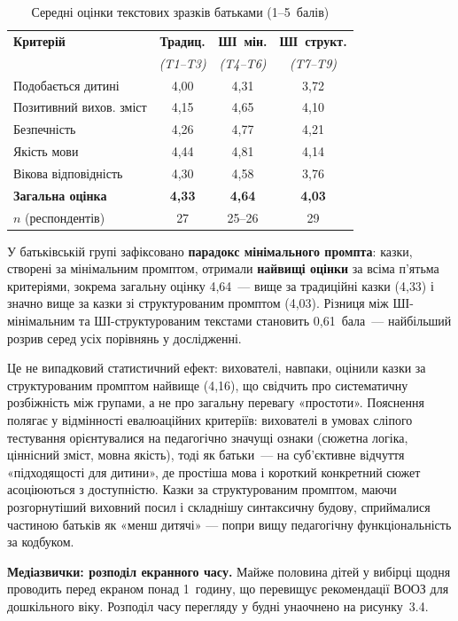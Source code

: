 \documentclass[14pt, a4paper]{extreport}
\begin{document}
\begin{table}[htbp]
\caption{Середні оцінки текстових зразків батьками (1--5~балів)}
\centering
\begin{tabular}{|l|c|c|c|}
\hline
\rowcolor{tblhead}\textbf{Критерій} & \textbf{Традиц.} & \textbf{ШІ~мін.} & \textbf{ШІ~структ.} \\
\rowcolor{tblhead} & \textit{(T1--T3)} & \textit{(T4--T6)} & \textit{(T7--T9)} \\
\hline
Подобається дитині     & 4{,}00 & 4{,}31 & 3{,}72 \\
Позитивний вихов. зміст & 4{,}15 & 4{,}65 & 4{,}10 \\
Безпечність            & 4{,}26 & 4{,}77 & 4{,}21 \\
Якість мови            & 4{,}44 & 4{,}81 & 4{,}14 \\
Вікова відповідність   & 4{,}30 & 4{,}58 & 3{,}76 \\
\textbf{Загальна оцінка} & \textbf{4{,}33} & \textbf{4{,}64} & \textbf{4{,}03} \\
\hline
$n$ (респондентів) & 27 & 25--26 & 29 \\
\hline
\end{tabular}
\end{table}

У батьківській групі зафіксовано \textbf{парадокс мінімального промпта}: казки, створені за мінімальним промптом, отримали \textbf{найвищі оцінки} за всіма п'ятьма критеріями, зокрема загальну оцінку 4{,}64~--- вище за традиційні казки (4{,}33) і значно вище за казки зі структурованим промптом (4{,}03). Різниця між ШІ-мінімальним та ШІ-структурованим текстами становить 0{,}61~бала~--- найбільший розрив серед усіх порівнянь у дослідженні.

Це не випадковий статистичний ефект: вихователі, навпаки, оцінили казки за структурованим промптом найвище (4{,}16), що свідчить про систематичну розбіжність між групами, а не про загальну перевагу «простоти». Пояснення полягає у відмінності евалюаційних критеріїв: вихователі в умовах сліпого тестування орієнтувалися на педагогічно значущі ознаки (сюжетна логіка, ціннісний зміст, мовна якість), тоді як батьки~--- на суб'єктивне відчуття «підходящості для дитини», де простіша мова і короткий конкретний сюжет асоціюються з доступністю. Казки за структурованим промптом, маючи розгорнутіший виховний посил і складнішу синтаксичну будову, сприймалися частиною батьків як «менш дитячі» --- попри вищу педагогічну функціональність за кодбуком.

\textbf{Медіазвички: розподіл екранного часу.} Майже половина дітей у вибірці щодня проводить перед екраном понад 1~годину, що перевищує рекомендації ВООЗ для дошкільного віку. Розподіл часу перегляду у будні унаочнено на рисунку~3.4.
\end{document}
